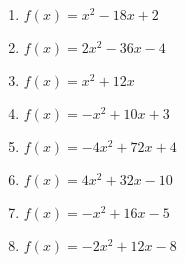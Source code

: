 \documentclass{article}%
\begin{document}
\begin{enumerate}[label=\alph*)]
\item%
\newline\vspace{0.5cm} $f(x)=x^2 - 18x + 2$%
\item%
\newline\vspace{0.5cm} $f(x)=2x^2 - 36x - 4$%
\item%
\newline\vspace{0.5cm} $f(x)=x^2 + 12x$%
\item%
\newline\vspace{0.5cm} $f(x)=-x^2 + 10x + 3$%
\item%
\newline\vspace{0.5cm} $f(x)=-4x^2 + 72x + 4$%
\item%
\newline\vspace{0.5cm} $f(x)=4x^2 + 32x - 10$%
\item%
\newline\vspace{0.5cm} $f(x)=-x^2 + 16x - 5$%
\item%
\newline\vspace{0.5cm} $f(x)=-2x^2 + 12x - 8$%
\end{enumerate}

%
\end{document}
